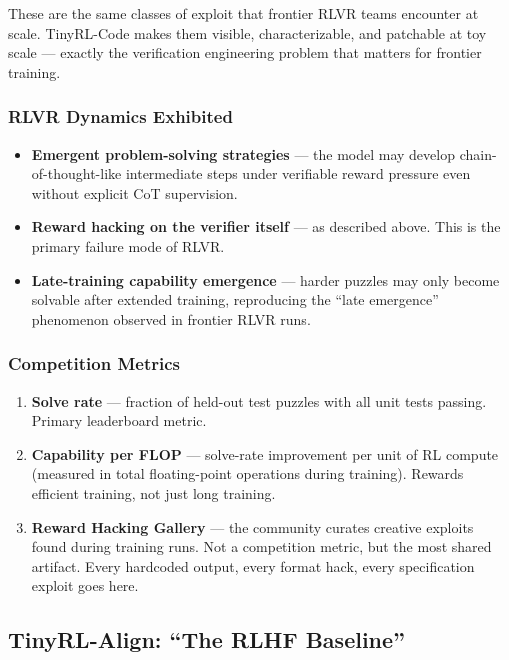 These are the same classes of exploit that frontier RLVR teams encounter at scale. TinyRL-Code makes them visible, characterizable, and patchable at toy scale --- exactly the verification engineering problem that matters for frontier training.

\subsubsection*{RLVR Dynamics Exhibited}

\begin{itemize}
  \item \textbf{Emergent problem-solving strategies} --- the model may develop chain-of-thought-like intermediate steps under verifiable reward pressure even without explicit CoT supervision.
  \item \textbf{Reward hacking on the verifier itself} --- as described above. This is the primary failure mode of RLVR.
  \item \textbf{Late-training capability emergence} --- harder puzzles may only become solvable after extended training, reproducing the ``late emergence'' phenomenon observed in frontier RLVR runs.
\end{itemize}

\subsubsection*{Competition Metrics}

\begin{enumerate}
  \item \textbf{Solve rate} --- fraction of held-out test puzzles with all unit tests passing. Primary leaderboard metric.
  \item \textbf{Capability per FLOP} --- solve-rate improvement per unit of RL compute (measured in total floating-point operations during training). Rewards efficient training, not just long training.
  \item \textbf{Reward Hacking Gallery} --- the community curates creative exploits found during training runs. Not a competition metric, but the most shared artifact. Every hardcoded output, every format hack, every specification exploit goes here.
\end{enumerate}

\subsection{TinyRL-Align: ``The RLHF Baseline''}

